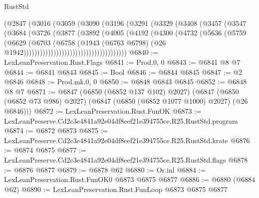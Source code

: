 \begin{lexlean}{RustStd}
\begin{coremodule}
                              (@2847
                                (@3016
                                  (@3059
                                    (@3090
                                      (@3196
                                        (@3291
                                          (@3329
                                            (@3408
                                              (@3457
                                                (@3547
                                                  (@3684
                                                    (@3726
                                                      (@3877
                                                        (@3892
                                                          (@4005
                                                            (@4192
                                                              (@4300
                                                                (@4732
                                                                  (@5636
                                                                    (@5759
                                                                      (@6629
                                                                        (@6703
                                                                          (@6758
                                                                            (@1943
                                                                              (@6763 @6798)
                                                                              (@26
                                                                                @1942))))))))))))))))))))))))))))))))))))))
@6840 := LexLeanPreservation.Rust.Flags
@6841 := Prod.{0, 0}
@6843 := @6841 @8 @7
@6844 := @6841 @6843
@6845 := Bool
@6846 := @6844 @6845
@6847 := @2 @6846
@6848 := Prod.mk.{0, 0}
@6850 := @6848 @6843 @6845
@6852 := @6848 @8 @7
@6871 := @6847
    (@6850 (@6852 @137 @102) @2027)
    (@6847 (@6850 (@6852 @73 @986) @2027) (@6847 (@6850 (@6852 @1077 @1000) @2027) (@26 @6846)))
@6872 := LexLeanPreservation.Rust.FunOK
@6873 := LexLeanPreserve.Cd2c3e4841a92e04df8eef21e394755ce.R25.RustStd.program
@6874 := @6872 @6873
@6875 := LexLeanPreserve.Cd2c3e4841a92e04df8eef21e394755ce.R25.RustStd.krate
@6876 := @6874 @6875
@6877 := LexLeanPreserve.Cd2c3e4841a92e04df8eef21e394755ce.R25.RustStd.flags
@6878 := @6876 @6877
@6879 := @6878 @62
@6880 := Or.inl
@6884 := LexLeanPreservation.Rust.FunOK0 @6873 @6875 @6877
@6886 := @6880 (@6884 @62)
@6890 := LexLeanPreservation.Rust.FunLoop @6873 @6875 @6877

\end{coremodule}
\end{lexlean}
